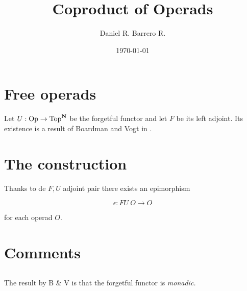 \documentclass{amsart}
\title{Coproduct of Operads}
\author{Daniel R. Barrero R.}
\date{\today}
\begin{document}
\maketitle

\section{Free operads}

Let $U : \mathrm{Op} \to \mathrm{Top}^{\mathbf{N}}$ be the forgetful functor and let $F$ be its
left adjoint. Its existence is a result of Boardman and Vogt in \cite{bv_hiasots}.

\section{The construction}

Thanks to de $F,U$ adjoint pair there exists an epimorphism

$$
\epsilon : FU \ O \to O
$$

for each operad $O$.


\section{Comments}

\subsection{} The result by B \& V is that the forgetful functor is \emph{monadic.}



\end{document}

